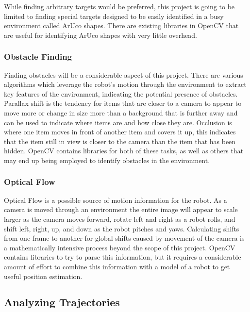 \documentclass{article}
\begin{document}
		While finding arbitrary targets would be preferred, this project is going to be limited to finding special targets designed to be easily identified in a busy environment called ArUco shapes. There are existing libraries in OpenCV that are useful for identifying ArUco shapes with very little overhead. 
		
		\subsubsection{Obstacle Finding}
		
		Finding obstacles will be a considerable aspect of this project. There are various algorithms which leverage the robot's motion through the environment to extract key features of the environment, indicating the potential presence of obstacles. Parallax shift is the tendency for items that are closer to a camera to appear to move more or change in size more than a background that is further away and can be used to indicate where items are and how close they are. Occlusion is where one item moves in front of another item and covers it up, this indicates that the item still in view is closer to the camera than the item that has been hidden. OpenCV contains libraries for both of these tasks, as well as others that may end up being employed to identify obstacles in the environment.
		
		\subsubsection{Optical Flow}
		
		Optical Flow is a possible source of motion information for the robot. As a camera is moved through an environment the entire image will appear to scale larger as the camera moves forward, rotate left and right as a robot rolls, and shift left, right, up, and down as the robot pitches and yaws. Calculating shifts from one frame to another for global shifts caused by movement of the camera is a mathematically intensive process beyond the scope of this project. OpenCV contains libraries to try to parse this information, but it requires a considerable amount of effort to combine this information with a model of a robot to get useful position estimation.
	
	\subsection{Analyzing Trajectories}
	
\end{document}
